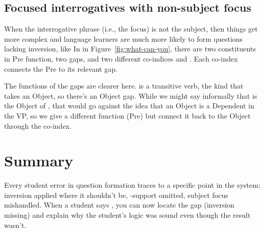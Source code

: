 \subsection{Focused interrogatives with non-subject focus}

When the interrogative phrase (i.e., the focus) is not the subject, then things get more complex and language learners are much more likely to form questions lacking inversion, like  In  in Figure~\ref{fig:what-can-you}, there are two constituents in \textsf{Pre} function, two gaps, and two different co-indices  and . Each co-index connects the \textsf{Pre} to its relevant gap. 

The functions of the gaps are clearer here.  is a transitive verb, the kind that takes an \textsf{Object}, so there's an \textsf{Object} gap. While we might say informally that  is the \textsf{Object} of , that would go against the idea that an \textsf{Object} is a \textsf{Dependent} in the VP, so we give  a different function (\textsf{Pre}) but connect it back to the \textsf{Object} through the  co-index.

\section{Summary}

Every student error in question formation traces to a specific point in the system: inversion applied where it shouldn't be, -support omitted, subject focus mishandled. When a student says , you can now locate the gap (inversion missing) and explain why the student's logic was sound even though the result wasn't.
